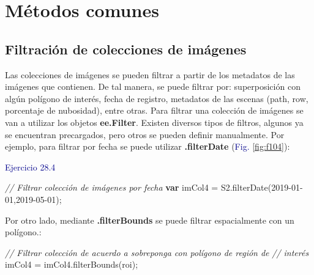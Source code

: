\documentclass[
  12pt,
  letterpaper,
  twoside]{book}
\newenvironment{Shaded}{\begin{snugshade}}{\end{snugshade}}
\newcommand{\CommentTok}[1]{\textcolor[rgb]{0.24,0.58,0.00}{\textit{#1}}}
\newcommand{\FunctionTok}[1]{\textcolor[rgb]{0.48,0.12,0.64}{#1}}
\newcommand{\KeywordTok}[1]{\textcolor[rgb]{0.00,0.00,0.00}{\textbf{#1}}}
\newcommand{\NormalTok}[1]{#1}
\newcommand{\OperatorTok}[1]{\textcolor[rgb]{0.00,0.00,0.00}{#1}}
\newcommand{\StringTok}[1]{\textcolor[rgb]{0.87,0.29,0.22}{#1}}
\newcommand\boldpurple[1]{\textcolor{darkpurple}{\textbf{#1}}}
\begin{document}
\hypertarget{muxe9todos-comunes-4}{%
\section{Métodos comunes}\label{muxe9todos-comunes-4}}

\hypertarget{filtraciuxf3n-de-colecciones-de-imuxe1genes}{%
\subsection*{Filtración de colecciones de imágenes}\label{filtraciuxf3n-de-colecciones-de-imuxe1genes}}

Las colecciones de imágenes se pueden filtrar a partir de los metadatos de las imágenes que contienen. De tal manera, se puede filtrar por: superposición con algún polígono de interés, fecha de registro, metadatos de las escenas (path, row, porcentaje de nubosidad), entre otras. Para filtrar una colección de imágenes se van a utilizar los objetos \boldpurple{ee.Filter}. Existen diversos tipos de filtros, algunos ya se encuentran precargados, pero otros se pueden definir manualmente. Por ejemplo, para filtrar por fecha se puede utilizar \boldpurple{.filterDate} (\textcolor{darkblue}{Fig.} \ref{fig:f104}):

\newpage

\textcolor{darkblue}{Ejercicio 28.4}

\begin{Shaded}
\begin{Highlighting}[]
\CommentTok{// Filtrar colección de imágenes por fecha}
\KeywordTok{var}\NormalTok{ imCol4 }\OperatorTok{=}\NormalTok{ S2}\OperatorTok{.}\FunctionTok{filterDate}\NormalTok{(}\StringTok{\textquotesingle{}2019{-}01{-}01\textquotesingle{}}\OperatorTok{,}\StringTok{\textquotesingle{}2019{-}05{-}01\textquotesingle{}}\NormalTok{)}\OperatorTok{;}
\end{Highlighting}
\end{Shaded}

Por otro lado, mediante \boldpurple{.filterBounds} se puede filtrar espacialmente con un polígono.:

\begin{Shaded}
\begin{Highlighting}[]
\CommentTok{// Filtrar colección de acuerdo a sobreponga con polígono de región de }
\CommentTok{// interés}
\NormalTok{imCol4 }\OperatorTok{=}\NormalTok{ imCol4}\OperatorTok{.}\FunctionTok{filterBounds}\NormalTok{(roi)}\OperatorTok{;}
\end{Highlighting}
\end{Shaded}
\end{document}
